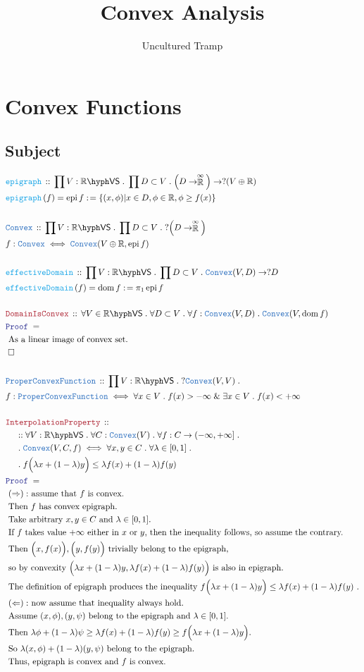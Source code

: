 \documentclass[12pt]{scrartcl}
\author{Uncultured Tramp}
\title{Convex Analysis}
\newcommand{\TYPE}[1]{\textcolor{NavyBlue}{\mathtt{#1}}}
\newcommand{\FUNC}[1]{\textcolor{Cerulean}{\mathtt{#1}}}
\newcommand{\LOGIC}[1]{\textcolor{Blue}{\mathtt{#1}}}
\newcommand{\THM}[1]{\textcolor{Maroon}{\mathtt{#1}}}
\renewcommand{\.}{\; . \;}
\newcommand{\de}{: \kern 0.1pc =}
\newcommand{\Act}[1]{\left( #1 \right)}
\newcommand{\Theorem}[2]{& \THM{#1} \, :: \, #2 \\ & \Proof = \\ }
\newcommand{\DeclareType}[2]{& \TYPE{#1} \, :: \, #2 \\}
\newcommand{\DefineType}[3]{& #1 : \TYPE{#2} \iff #3 \\}
\newcommand{\DeclareFunc}[2]{& \FUNC{#1} \, :: \, #2 \\}
\newcommand{\DefineNamedFunc}[4]{&  \FUNC{#1}\Act{#2} = #3 \de #4 \\}
\newcommand{\NewLine}{\\ & \kern 1pc}
\newcommand{\Page}[1]{ \begin{align*} #1 \end{align*}   }
\renewcommand{\And}{\; \& \;}
\newcommand{\Reals}{\mathbb{R} }
\newcommand{\EReals}{\stackrel{\mathclap{\infty}}{\mathbb{R}}}
\newcommand{\QED}{\; \square}
\newcommand{\EndProof}{& \QED \\}
\newcommand{\Proof}{\LOGIC{Proof} \; }
\newcommand{\Explain}[1]{& \text{#1.} \\}
\newcommand{\ExplainFurther}[1]{& \text{#1} \\}
\DeclareMathOperator*{\dom}{dom}
\newcommand{\VS}[1]{#1\hyph\mathsf{VS}} %
\newcommand{\Convex}{\TYPE{Convex}}
\DeclareMathOperator{\epi}{epi}
\begin{document}
\maketitle
\thispagestyle{empty}
\newpage
\tableofcontents
\thispagestyle{empty}
\newpage
{}
\section{Convex  Functions}
\subsection{Subject}
\Page{
	\DeclareFunc{epigraph}{\prod V : \VS{\Reals} \. \prod D \subset V \. \Big(D \to \EReals\Big) \to ?(V \oplus \Reals)}
	\DefineNamedFunc{epigraph}{f}{\epi f}{ \{ (x,\phi) | x \in D, \phi \in \Reals,  \phi \ge f(x)  \}  }
	\\
	\DeclareType{\Convex}{\prod V : \VS{\Reals} \.  \prod D \subset V \. ?\Big(D \to \EReals\Big)}
	\DefineType{f}{\Convex}{\Convex(V\oplus\Reals,\epi f) }
	\\
	\DeclareFunc{effectiveDomain}{\prod V : \VS{\Reals} \. \prod D \subset V \. \Convex(V,D) \to ?D}
	\DefineNamedFunc{effectiveDomain}{f}{\dom f}{ \pi_1 \epi f  }
	\\
	\Theorem{DomainIsConvex}{
		\forall V \in \VS{\Reals} \. 
		\forall D \subset V \. 
		\forall f : \Convex(V,D) \.
		\Convex(V,\dom f)
	}
	\Explain{ As a linear image of convex set}
	\EndProof
	\\
	\DeclareType{ProperConvexFunction}
	{
		\prod V : \VS{\Reals} \. ?\Convex(V,V) \.
	}
	\DefineType{f}{ProperConvexFunction}{\forall x \in V \. f(x) > -\infty \And \exists x \in V \. f(x) < + \infty}
	\\
	\Theorem{InterpolationProperty}
	{
		\NewLine ::		
		\forall V : \VS{\Reals} \.
		\forall C : \Convex(V) \.
		\forall f : C \to (-\infty,+\infty] \. \NewLine \.
		\Convex(V,C,f)
		\iff
		\forall x,y \in C \.
		\forall \lambda \in [0,1] \. \NewLine \.
		f\Big( \lambda x + (1- \lambda) y \Big) \le \lambda f(x) + (1-\lambda) f(y)
	}
	\Explain{
		$(\Rightarrow):$ assume that $f$ is convex}
	\Explain{
		Then $f$ has convex epigraph}
	\Explain{
		Take arbitrary $x,y \in C$ and $\lambda \in [0,1]$}
	\Explain{
		If $f$ takes value $+\infty$ either in $x$ or $y$, then the inequality follows,
		so assume the contrary}
	\ExplainFurther{
		Then $\Big(x,f(x)\Big),\Big(y,f(y)\Big)$ trivially belong to the epigraph,} 
	 \Explain{
	 	so by convexity $\Big( \lambda x + (1-\lambda)y, \lambda f(x) + (1-\lambda) f(y)\Big)$ 
	 	is also in epigraph}
	 \Explain{
	 	The definition of epigraph produces the inequality
	 	$f\Big( \lambda x + (1 - \lambda) y\Big) \le  \lambda f(x) + (1-\lambda) f(y)$
	 }
	 \Explain{
		$(\Leftarrow):$ now assume that inequality always hold}
	\Explain{
		Assume $(x,\phi),(y,\psi)$ belong to the epigraph and $\lambda \in [0,1]$}
	\Explain{
		Then $\lambda \phi + (1-\lambda)\psi \ge \lambda  f(x) + (1-\lambda)f(y) \ge 
		f\Big(\lambda x +(1-\lambda)y\Big)$}
	\Explain{
		So $\lambda (x,\phi) + (1-\lambda) (y,\psi )$ belong to the epigraph}
	\Explain{
		Thus, epigraph is convex and $f$ is convex}
}
\end{document}
